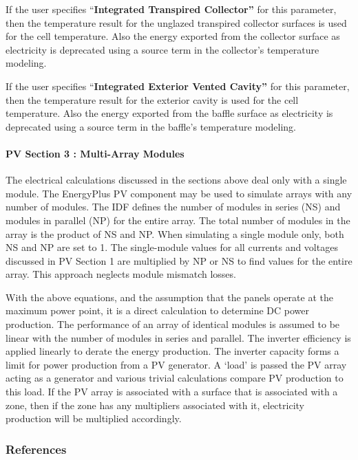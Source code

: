 If the user specifies ``\textbf{Integrated Transpired Collector''} for this parameter, then the temperature result for the unglazed transpired collector surfaces is used for the cell temperature. Also the energy exported from the collector surface as electricity is deprecated using a source term in the collector's temperature modeling.

If the user specifies ``\textbf{Integrated Exterior Vented Cavity''} for this parameter, then the temperature result for the exterior cavity is used for the cell temperature. Also the energy exported from the baffle surface as electricity is deprecated using a source term in the baffle's temperature modeling.

\paragraph{PV Section 3 : Multi-Array Modules}\label{pv-section-3-multi-array-modules}

The electrical calculations discussed in the sections above deal only with a single module. The EnergyPlus PV component may be used to simulate arrays with any number of modules. The IDF defines the number of modules in series (NS) and modules in parallel (NP) for the entire array. The total number of modules in the array is the product of NS and NP. When simulating a single module only, both NS and NP are set to 1. The single-module values for all currents and voltages discussed in PV Section 1 are multiplied by NP or NS to find values for the entire array. This approach neglects module mismatch losses.

With the above equations, and the assumption that the panels operate at the maximum power point, it is a direct calculation to determine DC power production. The performance of an array of identical modules is assumed to be linear with the number of modules in series and parallel. The inverter efficiency is applied linearly to derate the energy production. The inverter capacity forms a limit for power production from a PV generator. A `load' is passed the PV array acting as a generator and various trivial calculations compare PV production to this load. If the PV array is associated with a surface that is associated with a zone, then if the zone has any multipliers associated with it, electricity production will be multiplied accordingly.

\subsubsection{References}\label{references-035}


